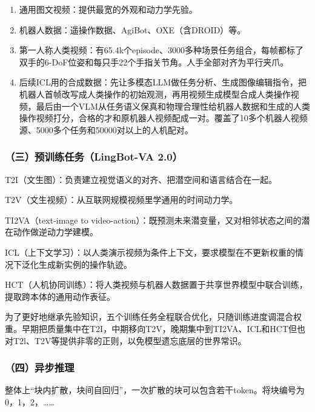 \begin{enumerate}
\def\labelenumi{\arabic{enumi}.}
\item
  通用图文视频：提供最宽的外观和动力学先验。
\item
  机器人数据：遥操作数据、AgiBot、OXE（含DROID）等。
\item
  第一人称人类视频：有65.4k个episode、3000多种场景任务组合，每帧都标了双手的6-DoF位姿和每只手22个手指关节角。人手全部对齐为平行夹爪。
\item
  后续ICL用的合成数据：先让多模态LLM做任务分析、生成图像编辑指令，把机器人首帧改写成人类操作的初始观测，再用视频生成模型合成人类操作视频，最后由一个VLM从任务语义保真和物理合理性给机器人数据和生成的人类操作视频打分，合格的才和原机器人视频配成一对。覆盖了10多个机器人视频源、5000多个任务和50000对以上的人机配对。
\end{enumerate}

\hypertarget{ux4e09ux9884ux8badux7ec3ux4efbux52a1lingbot-va-2.0}{%
\subsubsection{（三）预训练任务（LingBot-VA 2.0）}\label{ux4e09ux9884ux8badux7ec3ux4efbux52a1lingbot-va-2.0}}

T2I（文生图）：负责建立视觉语义的对齐、把潜空间和语言结合在一起。

T2V（文生视频）：从互联网规模视频里学通用的时间动力学。

TI2VA（text-image to video-action）：既预测未来潜变量，又对相邻状态之间的潜在动作做逆动力学建模。

ICL（上下文学习）：以人类演示视频为条件上下文，要求模型在不更新权重的情况下泛化生成新实例的操作轨迹。

HCT（人机协同训练）：将人类视频与机器人数据置于共享世界模型中联合训练，提取跨本体的通用动作表征。

为了更好地继承先验知识，五个训练任务全程联合优化，只随训练进度调混合权重。早期把质量集中在T2I，中期移向T2V，晚期集中到TI2VA、ICL和HCT但也对T2l、T2V等提供非零的正则，以免模型遗忘底层的世界常识。

\hypertarget{ux56dbux5f02ux6b65ux63a8ux7406}{%
\subsubsection{（四）异步推理}\label{ux56dbux5f02ux6b65ux63a8ux7406}}

整体上``块内扩散，块间自回归''，一次扩散的块可以包含若干token。将块编号为0，1，2，\ldots\ldots{}

